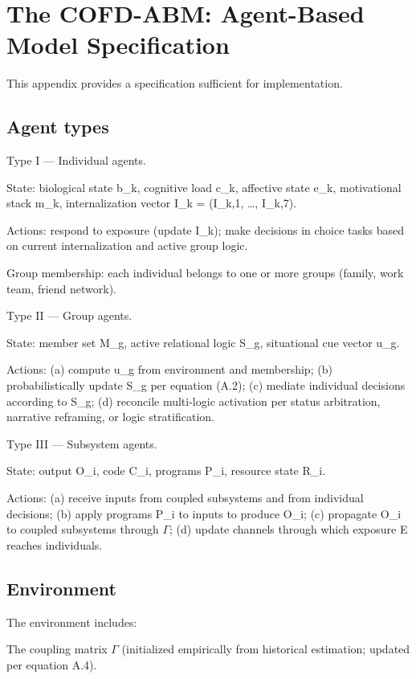 \documentclass[12pt,a4paper]{article}
\begin{document}
\section{The COFD-ABM: Agent-Based Model Specification}
\label{app:b}

This appendix provides a specification sufficient for implementation.

\subsection{Agent types}

Type I --- Individual agents.


State: {biological state b_k, cognitive load c_k, affective state e_k, motivational stack m_k, internalization vector I_k = (I_{k,1}, …, I_{k,7})}.

Actions: respond to exposure (update I_k); make decisions in choice tasks based on current internalization and active group logic.

Group membership: each individual belongs to one or more groups (family, work team, friend network).


Type II --- Group agents.


State: {member set M_g, active relational logic S_g, situational cue vector u_g}.

Actions: (a) compute u_g from environment and membership; (b) probabilistically update S_g per equation (A.2); (c) mediate individual decisions according to S_g; (d) reconcile multi-logic activation per status arbitration, narrative reframing, or logic stratification.


Type III --- Subsystem agents.


State: {output O_i, code C_i, programs P_i, resource state R_i}.

Actions: (a) receive inputs from coupled subsystems and from individual decisions; (b) apply programs P_i to inputs to produce O_i; (c) propagate O_i to coupled subsystems through $\Gamma$; (d) update channels through which exposure E reaches individuals.

\subsection{Environment}

The environment includes:


The coupling matrix $\Gamma$ (initialized empirically from historical estimation; updated per equation A.4).
\end{document}
